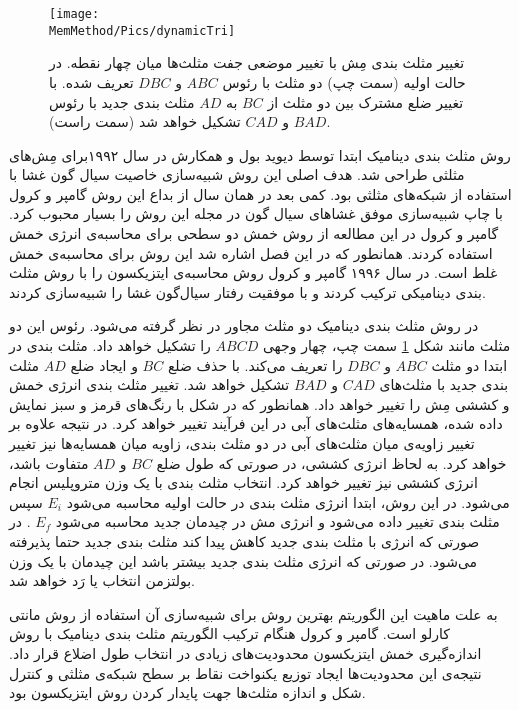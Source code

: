 \begin{figure}[h]
\begin{center}
\texttt{[image: \\MemMethod/Pics/dynamicTri]}
\caption{
تغییر مثلث بندی مِش با تغییر موضعی جفت مثلث‌ها میان چهار نقطه. در حالت اولیه (سمت چپ) دو مثلث با رئوس
$ABC$
و
$DBC$
تعریف شده. با تغییر ضلع مشترک بین دو مثلث از 
$BC$
به
$AD$
مثلث بندی جدید با رئوس
$BAD$
و 
$CAD$
تشکیل خواهد شد (سمت راست).
}
\label{fig:dynamicTri}
\end{center}
\end{figure}



روش  مثلث بندی دینامیک
ابتدا توسط دیوید بول
و همکارش 
\cite{Boal1992PRA}
در سال ۱۹۹۲برای مِش‌های مثلثی طراحی شد. هدف اصلی این روش شبیه‌سازی خاصیت سیال گون غشا با استفاده از شبکه‌های مثلثی بود. کمی‌ بعد در همان سال از بداع این روش گامپر و کرول با چاپ شبیه‌سازی موفق غشاهای سیال گون در مجله 
\cite{Gompper1992Science}
این روش را بسیار محبوب کرد. گامپر و کرول در این مطالعه از روش خمش دو سطحی برای محاسبه‌ی انرژی خمش استفاده کردند. همانطور که در این فصل اشاره شد این روش برای محاسبه‌ی خمش غلط است. در سال ۱۹۹۶ گامپر و کرول روش محاسبه‌ی ایتزیکسون را با روش مثلث بندی دینامیکی ترکیب کردند و با موفقیت رفتار سیال‌گون غشا را شبیه‌سازی کردند. 

در روش مثلث بندی دینامیک دو مثلث مجاور در نظر گرفته می‌شود. رئوس این دو مثلث مانند شکل 
\ref{fig:dynamicTri}
سمت چپ، چهار وجهی 
$ABCD$
را تشکیل خواهد داد. مثلث بندی در ابتدا دو مثلث 
$ABC$
و
$DBC$
را تعریف می‌کند. با حذف ضلع
$BC$
و ایجاد ضلع
$AD$
مثلث بندی جدید با مثلث‌های
$CAD$
و
$BAD$
تشکیل خواهد شد. تغییر مثلث بندی انرژی خمش و کششی مِش را تغییر خواهد داد. همانطور که در شکل با رنگ‌های قرمز و سبز نمایش داده شده، همسایه‌های مثلث‌های آبی در این فرآیند تغییر خواهد کرد. در نتیجه علاوه بر تغییر زاویه‌ی میان مثلث‌های آبی در دو مثلث بندی، زاویه میان همسایه‌ها نیز تغییر خواهد کرد. به لحاظ انرژی کششی، در صورتی که طول ضلع 
$BC$
و
$AD$
متفاوت باشد، انرژی کششی نیز تغییر خواهد کرد. انتخاب مثلث بندی با یک وزن متروپلیس انجام می‌شود. در این روش، ابتدا انرژی مثلث بندی در حالت اولیه محاسبه می‌شود
$E_i$
سپس مثلث بندی تغییر داده می‌شود و انرژی مش در چیدمان جدید محاسبه ‌می‌شود
$E_f$
. در صورتی که انرژی با مثلث بندی جدید کاهش پیدا کند مثلث بندی جدید حتما پذیرفته می‌شود. در صورتی که انرژی مثلث بندی جدید بیشتر باشد این چیدمان با یک وزن بولتزمن
انتخاب یا رَد خواهد شد. 

به علت ماهیت این الگوریتم بهترین روش برای شبیه‌سازی آن استفاده از روش مانتی کارلو
است. گامپر و کرول هنگام ترکیب الگوریتم مثلث بندی دینامیک با روش اندازه‌گیری خمش ایتزیکسون محدودیت‌های زیادی در انتخاب طول اضلاع قرار داد. نتیجه‌ی این محدودیت‌ها ایجاد توزیع یکنواخت نقاط بر سطح شبکه‌ی مثلثی و کنترل شکل و اندازه مثلث‌ها جهت پایدار کردن روش ایتزیکسون بود.

